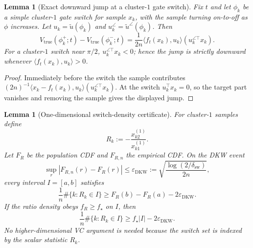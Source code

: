 \documentclass{article} %
\theoremstyle{plain}
\newtheorem{lemma}[theorem]{Lemma}
\theoremstyle{definition}
\theoremstyle{remark}
\begin{document}

\begin{lemma}[Exact downward jump at a cluster-$1$ gate switch]
\label{lem:gate-cliff-jump}
Fix $t$ and let $\phi_k$ be a simple cluster-$1$ gate switch for sample
$x_k$, with the sample turning on-to-off as $\phi$ increases.  Let
$u_k=\widetilde u(\phi_k)$ and $u_k^\angle=\widetilde u^\angle(\phi_k)$.
Then
\[
\boxed{
V_{\mathrm{true}}(\phi_k^+;t)
-
V_{\mathrm{true}}(\phi_k^-;t)
=
\frac1{2n}
\langle f_t(x_k),u_k\rangle
(u_k^{\angle\top}x_k).
}
\tag{gate-cliff-jump}\label{eq:gate-cliff-jump}
\]
For a cluster-$1$ switch near $\pi/2$,
$u_k^{\angle\top}x_k<0$; hence the jump is strictly downward whenever
$\langle f_t(x_k),u_k\rangle>0$.
\end{lemma}

\begin{proof}
Immediately before the switch the sample contributes
$(2n)^{-1}\langle x_k-f_t(x_k),u_k\rangle
(u_k^{\angle\top}x_k)$.  At the switch $u_k^\top x_k=0$, so the target part
vanishes and removing the sample gives the displayed jump.
\end{proof}

\begin{lemma}[One-dimensional switch-density certificate]
\label{lem:switch-density-DKW}
For cluster-$1$ samples define
\[
R_k:=-\frac{x_{k2}^{(1)}}{x_{k1}^{(1)}}.
\]
Let $F_R$ be the population CDF and $F_{R,n}$ the empirical CDF.  On the DKW
event
\[
\sup_r|F_{R,n}(r)-F_R(r)|
\le
\varepsilon_{\mathrm{DKW}}
:=
\sqrt{\frac{\log(2/\delta_{\mathrm{sw}})}{2n}},
\]
every interval $I=[a,b]$ satisfies
\[
\boxed{
\frac1n\#\{k:R_k\in I\}
\ge
F_R(b)-F_R(a)-2\varepsilon_{\mathrm{DKW}}.
}
\tag{switch-count-DKW}\label{eq:switch-count-DKW}
\]
If the ratio density obeys $f_R\ge f_\star$ on $I$, then
\[
\frac1n\#\{k:R_k\in I\}
\ge
f_\star|I|-2\varepsilon_{\mathrm{DKW}}.
\]
No higher-dimensional VC argument is needed because the switch set is
indexed by the scalar statistic $R_k$.
\end{lemma}

\end{document}
